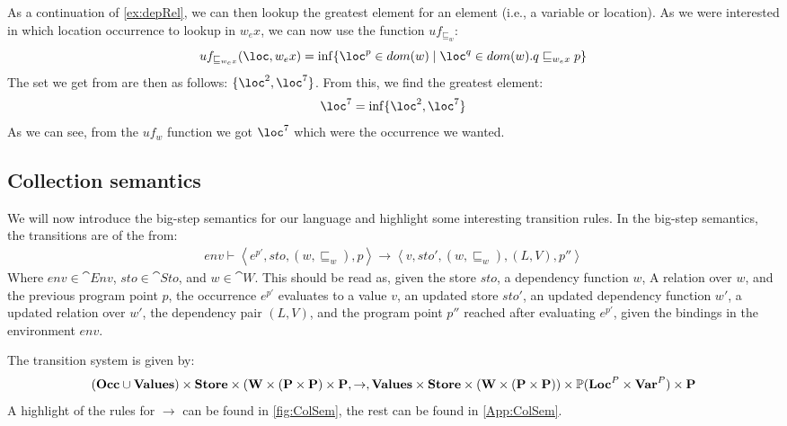 \documentclass[../../master.tex]{subfiles}
\begin{document}
\begin{example}[]\label{ex:dep}
	As a continuation of \cref{ex:depRel}, we can then lookup the greatest element for an element (i.e., a variable or location).
	As we were interested in which location occurrence to lookup in $w_ex$, we can now use the function $uf_{\sqsubseteq_w}$:
	$$uf_{\sqsubseteq_{w_ex}}(\loc,w_ex)=\inf\{\loc^p\in dom(w)\mid \loc^q\in dom(w). q\sqsubseteq_{w_ex} p\}$$
	The set we get from are then as follows: $\{\loc^2,\loc^7\}$.
	From this, we find the greatest element:
	$$\loc^7=\inf\{\loc^2,\loc^7\}$$
	As we can see, from the $uf_w$ function we got $\loc^7$ which were the occurrence we wanted.
\end{example}

\subsection{Collection semantics}\label{sec:sem}
We will now introduce the big-step semantics for our language and highlight some interesting transition rules.
In the big-step semantics, the transitions are of the from:
\begin{align*}
env\vdash\left\langle e^{p'},sto,(w,\sqsubseteq_w),p\right\rangle\rightarrow\left\langle v,sto',(w,\sqsubseteq_w),(L,V),p''\right\rangle
\end{align*}
Where $env\in\cat{Env}$, $sto\in\cat{Sto}$, and $w\in\cat{W}$.
This should be read as, given the store $sto$, a dependency function $w$, A relation over $w$, and the previous program point $p$, the occurrence $e^{p'}$ evaluates to a value $v$, an updated store $sto'$, an updated dependency function $w'$, 
a updated relation over $w'$, the dependency pair $(L,V)$, and the program point $p''$ reached after evaluating $e^{p'}$, given the bindings in the environment $env$.

The transition system is given by:
$$(\textbf{Occ}\cup\textbf{Values})\times\textbf{Store}\times(\textbf{W}\times(\textbf{P}\times\textbf{P})\times\textbf{P},\rightarrow,\textbf{Values}\times\textbf{Store}\times(\textbf{W}\times(\textbf{P}\times\textbf{P}))\times\mathbb{P}(\textbf{Loc}^P\times\textbf{Var}^P)\times\textbf{P}$$
A highlight of the rules for $\rightarrow$ can be found in \cref{fig:ColSem}, the rest can be found in \cref{App:ColSem}.
\end{document}

